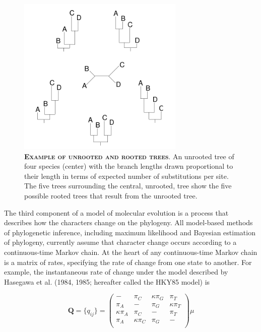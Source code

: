 \documentclass{svmult}
\begin{document}
\begin{figure}[t]
\centering
\includegraphics[height=3in]{fig1}
\caption{\textbf{\textsc{Example of unrooted and rooted trees}}.
An unrooted tree of four species (center) with the branch lengths drawn proportional
to their length in terms of expected number of substitutions per site. The five trees 
surrounding the central, unrooted, tree show the five possible rooted trees that result
from the unrooted tree. 
}
\label{fig1}
\end{figure}

The third component of a model of molecular evolution is a process that describes how the
characters change on the phylogeny. All model-based methods of phylogenetic inference, including
maximum likelihood and Bayesian estimation of phylogeny, currently assume that character change
occurs according to a continuous-time Markov chain. At the heart of any continuous-time Markov
chain is a matrix of rates, specifying the rate of change from one state to another. For example,
the instantaneous rate of change under the model described by Hasegawa et al. (1984, 1985;
hereafter called the HKY85 model) is

\begin{equation*}
{\mathbf Q} = \{q_{ij}\} = \left( \begin{array}{cccc}
-               &  \pi_C & \kappa \pi_G & \pi_T \\
\pi_A & -               & \pi_G & \kappa \pi_T \\
\kappa \pi_A & \pi_C & -               & \pi_T \\
\pi_A & \kappa \pi_C & \pi_G & -               \\
\end{array} \right) \mu
\end{equation*}
\end{document}
